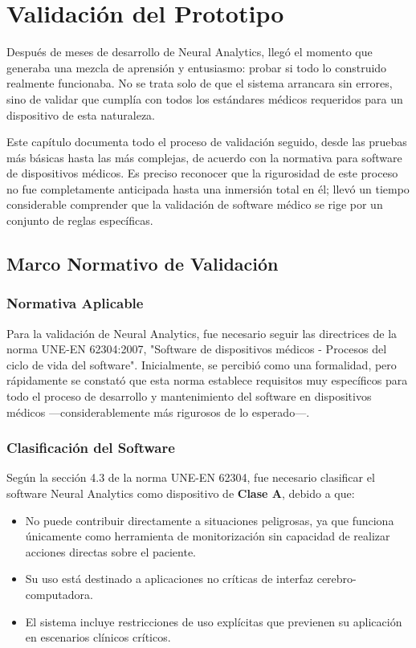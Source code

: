 \chapter{Validación del Prototipo}\label{ch:prototype_testing}

Después de meses de desarrollo de Neural Analytics, llegó el momento que generaba una mezcla de aprensión y entusiasmo: probar si todo lo construido realmente funcionaba. No se trata solo de que el sistema arrancara sin errores, sino de validar que cumplía con todos los estándares médicos requeridos para un dispositivo de esta naturaleza.

Este capítulo documenta todo el proceso de validación seguido, desde las pruebas más básicas hasta las más complejas, de acuerdo con la normativa para software de dispositivos médicos. Es preciso reconocer que la rigurosidad de este proceso no fue completamente anticipada hasta una inmersión total en él; llevó un tiempo considerable comprender que la validación de software médico se rige por un conjunto de reglas específicas.

\section{Marco Normativo de Validación}

\subsection{Normativa Aplicable}

Para la validación de Neural Analytics, fue necesario seguir las directrices de la norma \cite{UNE-EN-62304} UNE-EN 62304:2007, "Software de dispositivos médicos - Procesos del ciclo de vida del software". Inicialmente, se percibió como una formalidad, pero rápidamente se constató que esta norma establece requisitos muy específicos para todo el proceso de desarrollo y mantenimiento del software en dispositivos médicos —considerablemente más rigurosos de lo esperado—.

\subsection{Clasificación del Software}

Según la sección 4.3 de la norma UNE-EN 62304, fue necesario clasificar el software Neural Analytics como dispositivo de \textbf{Clase A}, debido a que:

\begin{itemize}
    \item No puede contribuir directamente a situaciones peligrosas, ya que funciona únicamente como herramienta de monitorización sin capacidad de realizar acciones directas sobre el paciente.
    \item Su uso está destinado a aplicaciones no críticas de interfaz cerebro-computadora.
    \item El sistema incluye restricciones de uso explícitas que previenen su aplicación en escenarios clínicos críticos.
\end{itemize}

